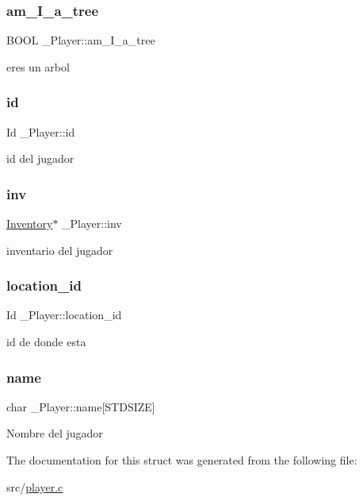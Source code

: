 \subsubsection{\texorpdfstring{am\+\_\+\+I\+\_\+a\+\_\+tree}{am\_I\_a\_tree}}
{\footnotesize\ttfamily B\+O\+OL \+\_\+\+Player\+::am\+\_\+\+I\+\_\+a\+\_\+tree}

eres un arbol \mbox{\label{struct__Player_a60d635cd063816a9c1bd873f4868bb90}} 
\subsubsection{\texorpdfstring{id}{id}}
{\footnotesize\ttfamily Id \+\_\+\+Player\+::id}

id del jugador \mbox{\label{struct__Player_aaaeeb03326c37ce62c333c2b94fde23c}} 
\subsubsection{\texorpdfstring{inv}{inv}}
{\footnotesize\ttfamily \hyperlink{struct__Inventory}{Inventory}$\ast$ \+\_\+\+Player\+::inv}

inventario del jugador \mbox{\label{struct__Player_aca2cb83e7a18dea36c33ad94e36a1e54}} 
\subsubsection{\texorpdfstring{location\+\_\+id}{location\_id}}
{\footnotesize\ttfamily Id \+\_\+\+Player\+::location\+\_\+id}

id de donde esta \mbox{\label{struct__Player_abd3fbad9568ff1e608654d58e71b8c58}} 
\subsubsection{\texorpdfstring{name}{name}}
{\footnotesize\ttfamily char \+\_\+\+Player\+::name\mbox{[}S\+T\+D\+S\+I\+ZE\mbox{]}}

Nombre del jugador 

The documentation for this struct was generated from the following file\+:\begin{DoxyCompactItemize}
\item 
src/\hyperlink{player_8c}{player.\+c}\end{DoxyCompactItemize}
